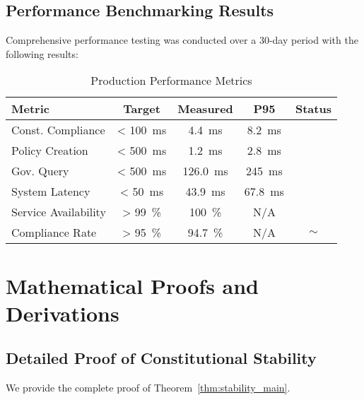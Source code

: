 \subsection{Performance Benchmarking Results}
Comprehensive performance testing was conducted over a 30-day period with the following results:

\begin{table}[H]
\centering
\caption{Production Performance Metrics}\label{tab:performance_metrics}
\footnotesize
\begin{tabular}{@{}p{2.2cm} S[table-format=3.0] S[table-format=3.1] S[table-format=3.0] c@{}}
\toprule
\textbf{Metric} & {\textbf{Target}} & {\textbf{Measured}} & {\textbf{P95}} & \textbf{Status} \\
\midrule
Const. Compliance & {< \SI{100}{\milli\second}} & \SI{4.4}{\milli\second} & \SI{8.2}{\milli\second} & \checkmarkcustom{} \\
Policy Creation & {< \SI{500}{\milli\second}} & \SI{1.2}{\milli\second} & \SI{2.8}{\milli\second} & \checkmarkcustom{} \\
Gov. Query & {< \SI{500}{\milli\second}} & \SI{126.0}{\milli\second} & \SI{245}{\milli\second} & \checkmarkcustom{} \\
System Latency & {< \SI{50}{\milli\second}} & \SI{43.9}{\milli\second} & \SI{67.8}{\milli\second} & \checkmarkcustom{} \\
Service Availability & {> \SI{99}{\percent}} & \SI{100}{\percent} & {N/A} & \checkmarkcustom{} \\
Compliance Rate & {> \SI{95}{\percent}} & \SI{94.7}{\percent} & {N/A} & $\sim$ \\
\bottomrule
\end{tabular}
\end{table}

\section{Mathematical Proofs and Derivations}\label{sec:appendix_proofs}

\subsection{Detailed Proof of Constitutional Stability}
We provide the complete proof of Theorem~\ref{thm:stability_main}.

